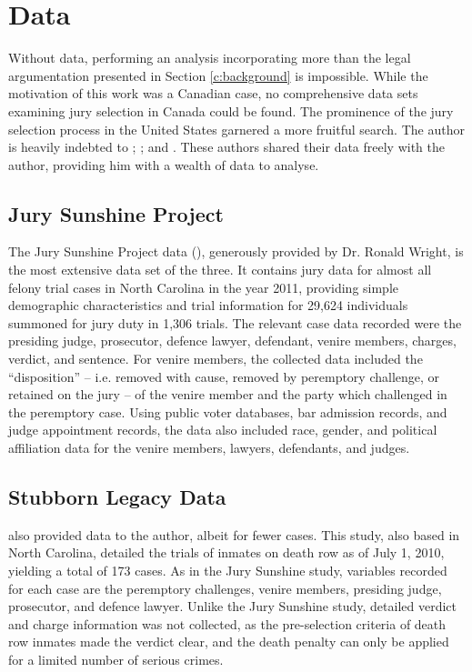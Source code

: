 \section{Data} \label{c:data}

Without data, performing an analysis incorporating more than the
legal argumentation presented in Section \ref{c:background} is impossible. While the motivation of this work was a Canadian case, no comprehensive
data sets examining jury selection in Canada could be found. The prominence of the jury selection process
in the United States garnered a more fruitful search. The author is heavily indebted to \citeauthor{JurySunshineProj}; \citeauthor{StubbornLegacy}; and
\citeauthor{PerempChalMurder}. These authors shared their data freely with the author, providing him with a wealth of data to
analyse.

\subsection{Jury Sunshine Project} \label{sec:jspdata}

The Jury Sunshine Project data (\cite{JurySunshineProj}), generously provided by Dr. Ronald Wright, is the most extensive data set of the three. It
contains jury data for almost all felony trial cases in North Carolina in the year 2011, providing simple demographic
characteristics and trial information for 29,624 individuals summoned
for jury duty in 1,306 trials. The relevant case data recorded were the presiding judge, prosecutor, defence lawyer, defendant, venire members,
charges, verdict, and sentence. For venire members, the collected data included the ``disposition'' -- i.e. removed with cause, removed by peremptory challenge, or retained on the jury -- of the venire member and the party which challenged in the peremptory case. Using public voter databases, bar admission records, and judge appointment records, the data also included race, gender, and political
affiliation data for the venire members, lawyers, defendants, and judges.

\subsection{Stubborn Legacy Data} \label{sec:norcardata}

\cite{StubbornLegacy} also provided data to the author, albeit for fewer cases. This study, also based in North Carolina,
detailed the trials of inmates on death row as of July 1, 2010, yielding a total of 173 cases. As in the Jury Sunshine study, variables recorded for each case are the peremptory challenges, venire members, presiding judge, prosecutor, and defence lawyer. Unlike the Jury Sunshine study, detailed verdict and charge information was not collected, as the pre-selection criteria of death row inmates made the verdict clear, and the death penalty can only be applied for a limited number of serious crimes.

